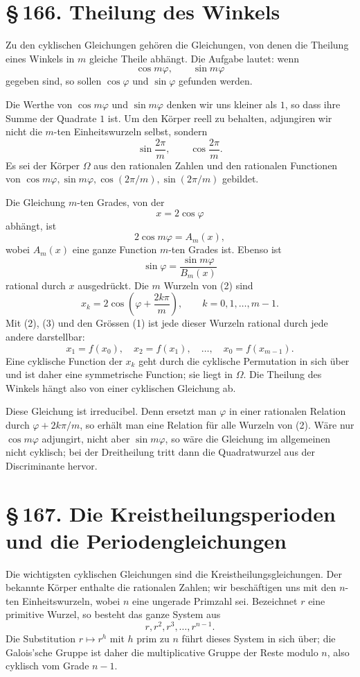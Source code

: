 \documentclass[11pt]{article}
\providecommand{\sect}[2]{\section*{\S\,#1. #2}}
\begin{document}
\sect{166}{Theilung des Winkels}

Zu den cyklischen Gleichungen gehören die Gleichungen, von denen die Theilung eines Winkels in $m$ gleiche Theile abhängt. Die Aufgabe lautet: wenn
\[
        \cos m\varphi,
        \qquad
        \sin m\varphi
\]
gegeben sind, so sollen $\cos\varphi$ und $\sin\varphi$ gefunden werden.

Die Werthe von $\cos m\varphi$ und $\sin m\varphi$ denken wir uns kleiner als $1$, so dass ihre Summe der Quadrate $1$ ist. Um den Körper reell zu behalten, adjungiren wir nicht die $m$-ten Einheitswurzeln selbst, sondern
\[
        \sin\frac{2\pi}{m},
        \qquad
        \cos\frac{2\pi}{m}.                                             \tag{1}
\]
Es sei der Körper $\Omega$ aus den rationalen Zahlen und den rationalen Functionen von $\cos m\varphi,\sin m\varphi,\cos(2\pi/m),\sin(2\pi/m)$ gebildet.

Die Gleichung $m$-ten Grades, von der
\[
        x=2\cos\varphi
\]
abhängt, ist
\[
        2\cos m\varphi=A_m(x),                                         \tag{2}
\]
wobei $A_m(x)$ eine ganze Function $m$-ten Grades ist. Ebenso ist
\[
        \sin\varphi=\frac{\sin m\varphi}{B_m(x)}                       \tag{3}
\]
rational durch $x$ ausgedrückt. Die $m$ Wurzeln von (2) sind
\[
        x_k=2\cos\left(\varphi+
        \frac{2k\pi}{m}\right),
        \qquad k=0,1,
        \ldots,m-1.
\]
Mit (2), (3) und den Grössen (1) ist jede dieser Wurzeln rational durch jede andere darstellbar:
\[
        x_1=f(x_0),\quad x_2=f(x_1),\quad\ldots,
        \quad x_0=f(x_{m-1}).
\]
Eine cyklische Function der $x_k$ geht durch die cyklische Permutation in sich über und ist daher eine symmetrische Function; sie liegt in $\Omega$. Die Theilung des Winkels hängt also von einer cyklischen Gleichung ab.

Diese Gleichung ist irreducibel. Denn ersetzt man $\varphi$ in einer rationalen Relation durch $\varphi+2k\pi/m$, so erhält man eine Relation für alle Wurzeln von (2). Wäre nur $\cos m\varphi$ adjungirt, nicht aber $\sin m\varphi$, so wäre die Gleichung im allgemeinen nicht cyklisch; bei der Dreitheilung tritt dann die Quadratwurzel aus der Discriminante hervor.

\sect{167}{Die Kreistheilungsperioden und die Periodengleichungen}

Die wichtigsten cyklischen Gleichungen sind die Kreistheilungsgleichungen. Der bekannte Körper enthalte die rationalen Zahlen; wir beschäftigen uns mit den $n$-ten Einheitswurzeln, wobei $n$ eine ungerade Primzahl sei. Bezeichnet $r$ eine primitive Wurzel, so besteht das ganze System aus
\[
        r,r^2,r^3,
        \ldots,r^{n-1}.                                                \tag{1}
\]
Die Substitution $r\mapsto r^h$ mit $h$ prim zu $n$ führt dieses System in sich über; die Galois'sche Gruppe ist daher die multiplicative Gruppe der Reste modulo $n$, also cyklisch vom Grade $n-1$.
\end{document}
